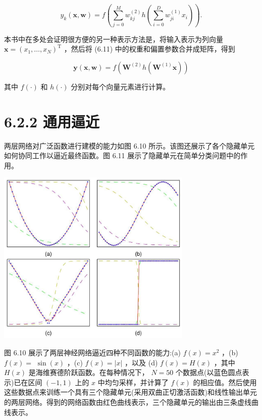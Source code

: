 \documentclass[10pt]{report}
\begin{document}
\[
{y}_{k}\left( {\mathbf{x},\mathbf{w}}\right)  = f\left( {\mathop{\sum }\limits_{{j = 0}}^{M}{w}_{kj}^{\left( 2\right) }h\left( {\mathop{\sum }\limits_{{i = 0}}^{D}{w}_{ji}^{\left( 1\right) }{x}_{i}}\right) }\right) . \tag{6.11}
\]

本书中在多处会证明很方便的另一种表示方法是，将输入表示为列向量 \(\mathbf{x} = {\left( {x}_{1},\ldots ,{x}_{N}\right) }^{\mathrm{T}}\) ，然后将 (6.11) 中的权重和偏置参数合并成矩阵，得到

\[
\mathbf{y}\left( {\mathbf{x},\mathbf{w}}\right)  = f\left( {{\mathbf{W}}^{\left( 2\right) }h\left( {{\mathbf{W}}^{\left( 1\right) }\mathbf{x}}\right) }\right)  \tag{6.12}
\]

其中 \(f\left( \cdot \right)\) 和 \(h\left( \cdot \right)\) 分别对每个向量元素进行计算。

\section*{6.2.2 通用逼近}

两层网络对广泛函数进行建模的能力如图 6.10 所示。该图还展示了各个隐藏单元如何协同工作以逼近最终函数。图 6.11 展示了隐藏单元在简单分类问题中的作用。

\begin{center}
\includegraphics[max width=0.7\textwidth]{images/0194e279-9b28-703a-88f4-c3ac21e2010d_201_658_352_873_787_0.jpg}
\end{center}
\hspace*{3em} 

图 6.10 展示了两层神经网络逼近四种不同函数的能力:(a) \(f\left( x\right)  = {x}^{2}\) ，(b) \(f\left( x\right)  =\)  \(\sin \left( x\right)\) ，(c) \(f\left( x\right)  = \left| x\right|\) ，以及 (d) \(f\left( x\right)  = H\left( x\right)\) ，其中 \(H\left( x\right)\) 是海维赛德阶跃函数。在每种情况下， \(N = {50}\) 个数据点(以蓝色圆点表示)已在区间 \(\left( {-1,1}\right)\) 上的 \(x\) 中均匀采样，并计算了 \(f\left( x\right)\) 的相应值。然后使用这些数据点来训练一个具有三个隐藏单元(采用双曲正切激活函数)和线性输出单元的两层网络。得到的网络函数由红色曲线表示，三个隐藏单元的输出由三条虚线曲线表示。
\end{document}
